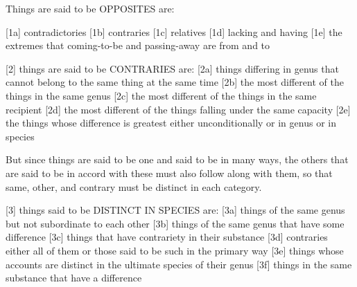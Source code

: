
Things are said to be OPPOSITES are:

[1a]    contradictories
[1b]    contraries
[1c]    relatives
[1d]    lacking and having
[1e]    the extremes that coming-to-be and passing-away are
        from and to

[2]     things are said to be CONTRARIES are:
[2a]    things differing in genus that cannot belong to
        the same thing at the same time
[2b]    the most different of the things in the same genus
[2c]    the most different of the things in the same recipient
[2d]    the most different of the things falling under the same capacity
[2e]    the things whose difference is greatest either
        unconditionally or in genus or in species

But since things are said to be one and said to be in many ways,
the others that are said to be in accord with these must also follow along
with them, so that same, other, and contrary must be distinct in each category.

[3]     things said to be DISTINCT IN SPECIES are:
[3a]    things of the same genus but not subordinate to each other
[3b]    things of the same genus that have some difference
[3c]    things that have contrariety in their substance
[3d]    contraries either all of them or those said to be such in the primary way
[3e]    things whose accounts are distinct in the ultimate species of their genus
[3f]    things in the same substance that have a difference
